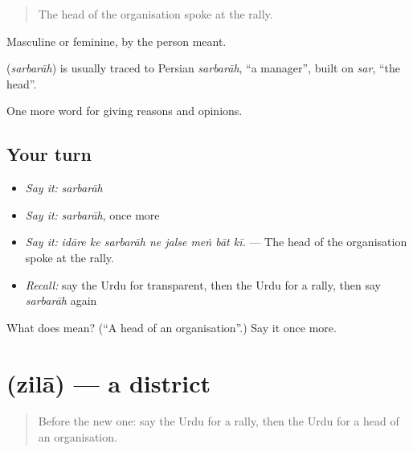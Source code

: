 \begin{quote}
The head of the organisation spoke at the rally.
\end{quote}

Masculine or feminine, by the person meant.

\begin{cousinweb}
\textbf{} (\emph{sarbarāh}) is usually traced to Persian \emph{sarbarāh}, \textquotedblleft{}a manager\textquotedblright{}, built on \emph{sar}, \textquotedblleft{}the head\textquotedblright{}.
\end{cousinweb}

\begin{grammarlens}[title={What you've built}]
One more word for giving reasons and opinions.
\end{grammarlens}

\subsection*{Your turn}
\begin{itemize}
\raggedright
  \item \emph{Say it:} \emph{sarbarāh}
  \item \emph{Say it:} \emph{sarbarāh}, once more
  \item \emph{Say it:} \emph{idāre ke sarbarāh ne jalse meṅ bāt kī.} — The head of the organisation spoke at the rally.
  \item \emph{Recall:} say the Urdu for transparent, then the Urdu for a rally, then say \emph{sarbarāh} again
\end{itemize}

\begin{tcolorbox}[breakable,colback=teal!4,colframe=teal!35!black,title={Before you move on}]
What does  mean? (\textquotedblleft{}A head of an organisation\textquotedblright{}.) Say it once more.
\end{tcolorbox}
\section[\texorpdfstring{\ur{ضلع} (zilā)}{ضلع (zilā)}]{ (zilā) — a district}

\label{lesson:UR-C358-zila}



\begin{quote}
Before the new one: say the Urdu for a rally, then the Urdu for a head of an organisation.
\end{quote}

